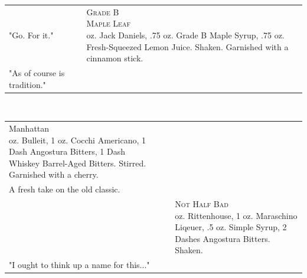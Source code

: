\documentclass{article}
\makeatletter
\newcommand \Dotfill {\leavevmode \cleaders \hb@xt@ .25em{\hss .\hss }\hfill \kern \z@}%
\makeatother
\begin{document}
{\begin{tabular}{m{}m{}m{}}
\centering\small{"Go. For it."}
&
&
{\centering\Huge\textsc{Grade B\\[-10pt] Maple Leaf}\\*}
\centering 2 oz. Jack Daniels, .75 oz. Grade B Maple Syrup, .75 oz. Fresh-Squeezed Lemon Juice. Shaken.  Garnished with a cinnamon stick.\\
\centering\small{"As of course is tradition."}
\end{tabular}
\\\makebox[\columnwidth]{\Huge\Dotfill}
\begin{tabular}{m{}m{}m{}}
{\centering\Huge{Manhattan}\\*}
\centering 2 oz. Bulleit, 1 oz. Cocchi Americano, 1 Dash Angostura Bitters, 1 Dash Whiskey Barrel-Aged Bitters. Stirred. Garnished with a cherry.\\
\centering\small{A fresh take on the old classic.}\\
&
&
{\centering\Huge\textsc{Not Half Bad}\\*}
\centering 2 oz. Rittenhouse, 1 oz. Maraschino Liqeuer, .5 oz. Simple Syrup, 2 Dashes Angostura Bitters. Shaken. \\
\centering\small{"I ought to think up a name for this..."}
\end{tabular}\\[-4pt]
\makebox[\columnwidth]{\Huge\Dotfill}

}
\end{document}
